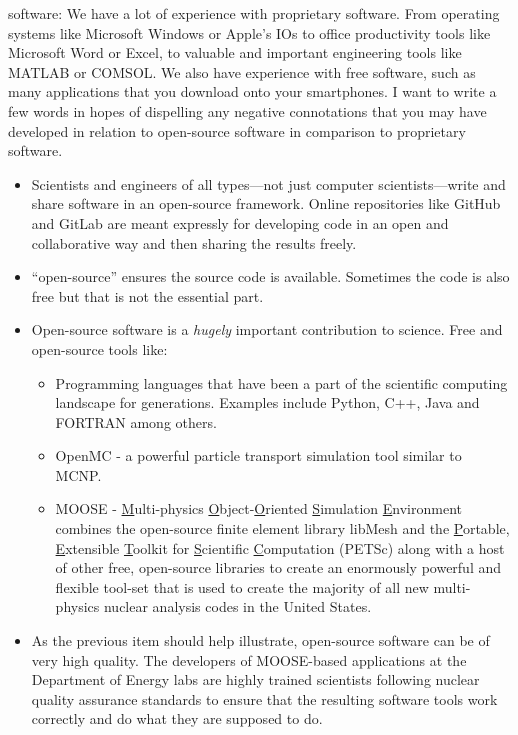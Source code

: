  software:
We have a lot of experience with proprietary software. From operating systems like Microsoft Windows or Apple's IOs to office productivity tools like Microsoft Word or Excel, to valuable and important engineering tools like MATLAB or COMSOL.  We also have experience with free software, such as many applications that you download onto your smartphones.  I want to write a few words in hopes of dispelling any negative connotations that you may have developed in relation to open-source software in comparison to proprietary software.
\begin{itemize}
\item Scientists and engineers of all types---not just computer scientists---write and share software in an open-source framework.  Online repositories like GitHub and GitLab are meant expressly for developing code in an open and collaborative way and then sharing the results freely.
\item ``open-source'' ensures the source code is available.  Sometimes the code is also free but that is not the essential part.

\item Open-source software is a \emph{hugely} important contribution to science.  Free and open-source tools like:
\begin{itemize}
\item Programming languages that have been a part of the scientific computing landscape for generations.  Examples include Python, C++, Java and FORTRAN among others.
\item OpenMC\cite{ROMANO201590} - a powerful particle transport simulation tool similar to MCNP.
\item MOOSE - \underline{M}ulti-physics \underline{O}bject-\underline{O}riented \underline{S}imulation \underline{E}nvironment\cite{lindsay2022moose} combines the open-source finite element library libMesh\cite{kirk2006libmesh} and the \underline{P}ortable, \underline{E}xtensible \underline{T}oolkit for \underline{S}cientific \underline{C}omputation (PETSc)\cite{petsc-user-ref} along with a host of other free, open-source libraries to create an enormously powerful and flexible tool-set that is used to create the majority of all new multi-physics nuclear analysis codes in the United States.
\end{itemize} 
\item As the previous item should help illustrate, open-source software can be of very high quality.  The developers of MOOSE-based applications at the Department of Energy labs are highly trained scientists following nuclear quality assurance standards to ensure that the resulting software tools work correctly and do what they are supposed to do. 


\end{itemize}
